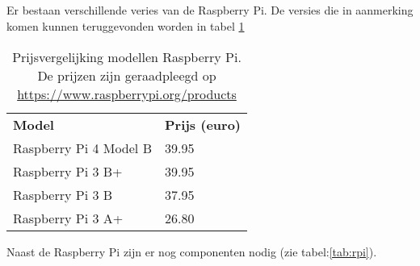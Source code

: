 \subsection{}
Er bestaan verschillende veries van de Raspberry Pi. De versies die in aanmerking komen kunnen teruggevonden worden in tabel \ref{tab:rpimodellen}
\begin{table}[]
	\begin{tabular}{ll}
		\textbf{Model}                  & \textbf{Prijs (euro)} \\
		Raspberry Pi 4 Model B & 39.95        \\
		Raspberry Pi 3 B+      & 39.95        \\
		Raspberry Pi 3 B       & 37.95        \\
		Raspberry Pi 3 A+      & 26.80       
	\end{tabular}
\caption{Prijsvergelijking modellen Raspberry Pi. De prijzen zijn geraadpleegd op \url{https://www.raspberrypi.org/products}}
\label{tab:rpimodellen}
\end{table}
\newline
Naast de Raspberry Pi zijn er nog componenten nodig (zie tabel:\ref{tab:rpi}).
